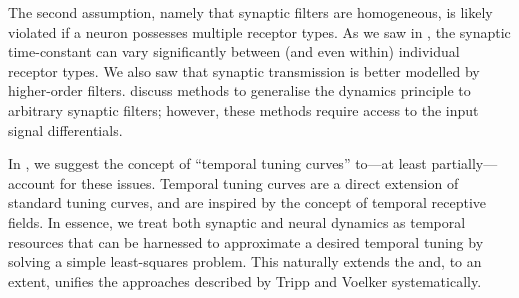 The second assumption, namely that synaptic filters are homogeneous, is likely violated if a neuron possesses multiple receptor types.
As we saw in , the synaptic time-constant can vary significantly between (and even within) individual receptor types.
We also saw that synaptic transmission is better modelled by higher-order filters.
 discuss methods to generalise the dynamics principle to arbitrary synaptic filters; however, these methods require access to the input signal differentials.

In , we suggest the concept of \enquote{temporal tuning curves} to---at least partially---account for these issues.
Temporal tuning curves are a direct extension of standard \NEF tuning curves, and are inspired by the concept of temporal receptive fields.
In essence, we treat both synaptic and neural dynamics as temporal resources that can be harnessed to approximate a desired temporal tuning by solving a simple least-squares problem.
This naturally extends the \NEF and, to an extent, unifies the approaches described by Tripp and Voelker systematically.
